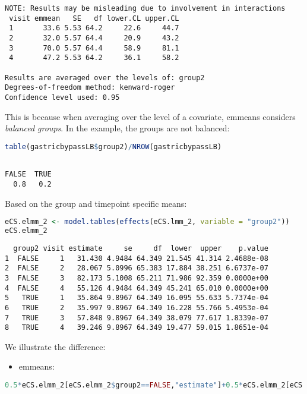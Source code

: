 \documentclass[12pt]{article}
\begin{document}
\label{}
\begin{verbatim}
NOTE: Results may be misleading due to involvement in interactions
 visit emmean   SE   df lower.CL upper.CL
 1       33.6 5.53 64.2     22.6     44.7
 2       32.0 5.57 64.4     20.9     43.2
 3       70.0 5.57 64.4     58.9     81.1
 4       47.2 5.53 64.2     36.1     58.2

Results are averaged over the levels of: group2 
Degrees-of-freedom method: kenward-roger 
Confidence level used: 0.95
\end{verbatim}

This is because when averaging over the level of a covariate, emmeans
considers \emph{balanced groups}. In the example, the groups are not
balanced:
\begin{lstlisting}[language=r,numbers=none]
table(gastricbypassLB$group2)/NROW(gastricbypassLB)
\end{lstlisting}

\label{}
\begin{verbatim}

FALSE  TRUE 
  0.8   0.2
\end{verbatim}


Based on the group and timepoint specific means:
\begin{lstlisting}[language=r,numbers=none]
eCS.elmm_2 <- model.tables(effects(eCS.lmm_2, variable = "group2"))
eCS.elmm_2
\end{lstlisting}

\label{}
\begin{verbatim}
  group2 visit estimate     se     df  lower  upper    p.value
1  FALSE     1   31.430 4.9484 64.349 21.545 41.314 2.4688e-08
2  FALSE     2   28.067 5.0996 65.383 17.884 38.251 6.6737e-07
3  FALSE     3   82.173 5.1008 65.211 71.986 92.359 0.0000e+00
4  FALSE     4   55.126 4.9484 64.349 45.241 65.010 0.0000e+00
5   TRUE     1   35.864 9.8967 64.349 16.095 55.633 5.7374e-04
6   TRUE     2   35.997 9.8967 64.349 16.228 55.766 5.4953e-04
7   TRUE     3   57.848 9.8967 64.349 38.079 77.617 1.8339e-07
8   TRUE     4   39.246 9.8967 64.349 19.477 59.015 1.8651e-04
\end{verbatim}


We illustrate the difference:
\begin{itemize}
\item emmeans:
\end{itemize}
\begin{lstlisting}[language=r,numbers=none]
0.5*eCS.elmm_2[eCS.elmm_2$group2==FALSE,"estimate"]+0.5*eCS.elmm_2[eCS.elmm_2$group2==TRUE,"estimate"]
\end{lstlisting}
\end{document}
